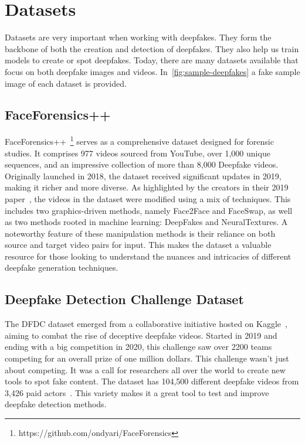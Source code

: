 \section{Datasets}
Datasets are very important when working with deepfakes. They form the backbone of both
the creation and detection of deepfakes. They also help us train models to create or spot
deepfakes. Today, there are many datasets available that focus on both deepfake images
and videos. In~\autoref{fig:sample-deepfakes} a fake sample image of each dataset is provided.

\subsection{FaceForensics++}
FaceForensics++~\footnote{https://github.com/ondyari/FaceForensics} serves as a comprehensive dataset designed for forensic studies. It
comprises 977 videos sourced from YouTube, over 1,000 unique sequences, and an
impressive collection of more than 8,000 Deepfake videos. Originally launched in
2018, the dataset received significant updates in 2019, making it richer and more
diverse. As highlighted by the creators in their 2019 paper~\cite{roessler2019faceforensicspp},
the videos in the dataset were modified using a mix of techniques. This includes two
graphics-driven methods, namely Face2Face and FaceSwap, as well as two methods rooted
in machine learning: DeepFakes and NeuralTextures. A noteworthy feature of these
manipulation methods is their reliance on both source and target video pairs for input.
This makes the dataset a valuable resource for those looking to understand the
nuances and intricacies of different deepfake generation techniques.

\subsection{Deepfake Detection Challenge Dataset}
The \ac{DFDC} dataset emerged from a collaborative initiative hosted on Kaggle~\cite{kaggle2020},
aiming to combat the rise of deceptive deepfake videos. Started in 2019 and ending
with a big competition in 2020, this challenge saw over 2200 teams competing for an
overall prize of one million dollars. This challenge wasn't just about competing.
It was a call for researchers all over the world to create new tools to spot fake
content. The dataset has 104,500 different deepfake videos from 3,426 paid
actors~\cite{dolhansky2020deepfake}. This variety makes it a great tool to test and improve deepfake detection
methods.

